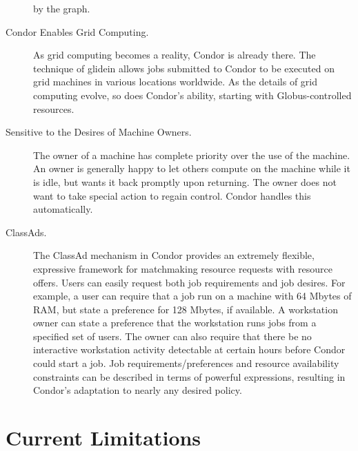 \begin{description}
by the graph.
	\item[Condor Enables Grid Computing.] As grid computing
becomes a reality, Condor is already there.
The technique of glidein allows jobs submitted to Condor
to be executed on grid machines in various locations worldwide.
As the details of grid computing evolve, so does Condor's
ability, starting with Globus-controlled resources.
	\item[Sensitive to the Desires of Machine Owners.] The
owner of a machine has complete priority over the use
of the machine.
An owner is generally happy to let others compute on
the machine while it is idle, but wants it back
promptly upon returning. The owner does not want to take special
action to regain control. Condor handles this automatically. 
	\item[ClassAds.]The ClassAd mechanism 
in Condor provides an extremely
flexible, expressive framework for matchmaking
resource requests with resource offers.
Users can easily request both job requirements and job desires.
For example, a user can require that a job run on a machine
with 64 Mbytes of RAM,
but state a preference for 128 Mbytes, if available.
A workstation owner
can state a preference that the workstation runs jobs
from a specified set of users. 
The owner can also require that there be no interactive workstation
activity detectable at certain hours before Condor could
start a job.
Job requirements/preferences and resource availability constraints can be
described in terms of powerful expressions, resulting in
Condor's adaptation to nearly any desired policy. 
\end{description}

\section{\label{sec:current-limitations}Current Limitations}

